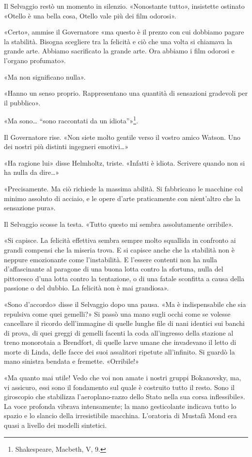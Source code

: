 \documentclass[
a5paper, %
10pt, %
twoside, 
onecolumn, %
openany, %
]{memoir}
\begin{document}
Il Selvaggio restò un momento in silenzio. «Nonostante tutto», insistette ostinato «Otello è una bella cosa, Otello vale più dei film odorosi».

«Certo», ammise il Governatore «ma questo è il prezzo con cui dobbiamo pagare la stabilità. Bisogna scegliere tra la felicità e ciò che una volta si chiamava la grande arte. Abbiamo sacrificato la grande arte. Ora abbiamo i film odorosi e l’organo profumato».

«Ma non significano nulla».

«Hanno un senso proprio. Rappresentano una quantità di sensazioni gradevoli per il pubblico».

«Ma sono… “sono raccontati da un idiota”»\footnote{Shakespeare, Macbeth, V, 9.}.

Il Governatore rise. «Non siete molto gentile verso il vostro amico Watson. Uno dei nostri più distinti ingegneri emotivi…»

«Ha ragione lui» disse Helmholtz, triste. «Infatti è idiota. Scrivere quando non si ha nulla da dire…»

«Precisamente. Ma ciò richiede la massima abilità. Si fabbricano le macchine col minimo assoluto di acciaio, e le opere d’arte praticamente con nient’altro che la sensazione pura».

Il Selvaggio scosse la testa. «Tutto questo mi sembra assolutamente orribile».

«Si capisce. La felicità effettiva sembra sempre molto squallida in confronto ai grandi compensi che la miseria trova. E si capisce anche che la stabilità non è neppure emozionante come l’instabilità. E l’essere contenti non ha nulla d’affascinante al paragone di una buona lotta contro la sfortuna, nulla del pittoresco d’una lotta contro la tentazione, o di una fatale sconfitta a causa della passione o del dubbio. La felicità non è mai grandiosa».

«Sono d’accordo» disse il Selvaggio dopo una pausa. «Ma è indispensabile che sia repulsiva come quei gemelli?» Si passò una mano sugli occhi come se volesse cancellare il ricordo dell’immagine di quelle lunghe file di nani identici sui banchi di prova, di quei greggi di gemelli facenti la coda all’ingresso della stazione al treno monorotaia a Brendfort, di quelle larve umane che invadevano il letto di morte di Linda, delle facce dei suoi assalitori ripetute all’infinito. Si guardò la mano sinistra bendata e fremette. «Orribile!»

«Ma quanto mai utile! Vedo che voi non amate i nostri gruppi Bokanovsky, ma, vi assicuro, essi sono il fondamento sul quale è costruito tutto il resto. Sono il giroscopio che stabilizza l’aeroplano-razzo dello Stato nella sua corsa inflessibile». La voce profonda vibrava intensamente; la mano gesticolante indicava tutto lo spazio e lo slancio della irresistibile macchina. L’oratoria di Mustafà Mond era quasi a livello dei modelli sintetici.
\end{document}
